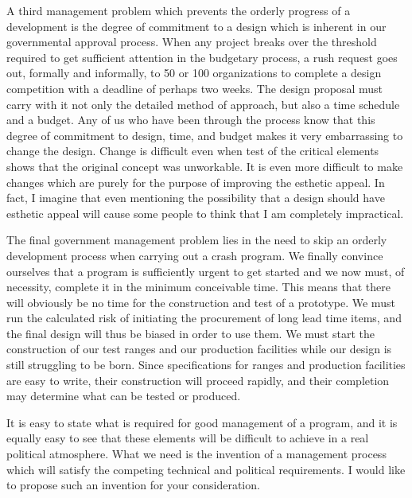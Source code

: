 \documentclass{memoir}
\begin{document}
A third management problem which prevents the orderly progress of a development is the degree of commitment to a design which is inherent in our governmental approval process. When any project breaks over the threshold required to get sufficient attention in the budgetary process, a rush request goes out, formally and informally, to 50 or 100 organizations to complete a design competition with a deadline of perhaps two weeks. The design proposal must carry with it not only the detailed method of approach, but also a time schedule and a budget. Any of us who have been through the process know that this degree of commitment to design, time, and budget makes it very embarrassing to change the design. Change is difficult even when test of the critical elements shows that the original concept was unworkable. It is even more difficult to make changes which are purely for the purpose of improving the esthetic appeal. In fact, I imagine that even mentioning the possibility that a design should have esthetic appeal will cause some people to think that I am completely impractical.

The final government management problem lies in the need to skip an orderly development process when carrying out a crash program. We finally convince ourselves that a program is sufficiently urgent to get started and we now must, of necessity, complete it in the minimum conceivable time. This means that there will obviously be no time for the construction and test of a prototype. We must run the calculated risk of initiating the procurement of long lead time items, and the final design will thus be biased in order to use them. We must start the construction of our test ranges and our production facilities while our design is still struggling to be born. Since specifications for ranges and production facilities are easy to write, their construction will proceed rapidly, and their completion may determine what can be tested or produced.

It is easy to state what is required for good management of a program, and it is equally easy to see that these elements will be difficult to achieve in a real political atmosphere. What we need is the invention of a management process which will satisfy the competing technical and political requirements. I would like to propose such an invention for your consideration.
\end{document}
